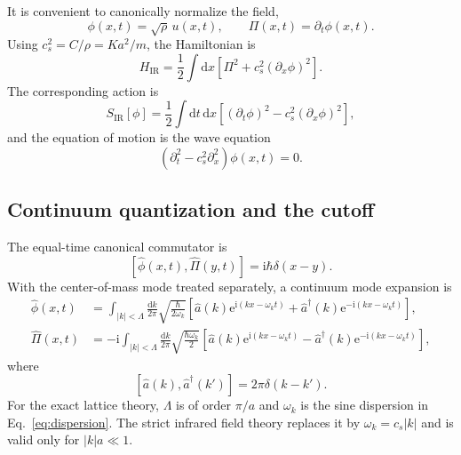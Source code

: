 \documentclass[11pt]{article}
\newcommand{\dd}{\mathrm{d}}
\newcommand{\e}{\mathrm{e}}
\newcommand{\ii}{\mathrm{i}}
\newcommand{\comm}[2]{\left[#1,#2\right]}
\begin{document}
It is convenient to canonically normalize the field,
\begin{equation}
  \phi(x,t)=\sqrt\rho\,u(x,t),
  \qquad
  \Pi(x,t)=\partial_t\phi(x,t).
  \label{eq:phirescale}
\end{equation}
Using $c_s^2=C/\rho=Ka^2/m$, the Hamiltonian is
\begin{equation}
  \boxed{
  H_{\mathrm{IR}}
  =\frac12\int\dd x\left[
    \Pi^2+c_s^2(\partial_x\phi)^2
  \right].
  }
  \label{eq:Hscalar}
\end{equation}
The corresponding action is
\begin{equation}
  S_{\mathrm{IR}}[\phi]
  =\frac12\int\dd t\,\dd x\left[
    (\partial_t\phi)^2-c_s^2(\partial_x\phi)^2
  \right],
  \label{eq:Sscalar}
\end{equation}
and the equation of motion is the wave equation
\begin{equation}
  \boxed{
  (\partial_t^2-c_s^2\partial_x^2)\phi(x,t)=0.
  }
  \label{eq:waveequation}
\end{equation}

\subsection{Continuum quantization and the cutoff}

The equal-time canonical commutator is
\begin{equation}
  \comm{\hat\phi(x,t)}{\hat\Pi(y,t)}
  =\ii\hbar\delta(x-y).
  \label{eq:continuumCCR}
\end{equation}
With the center-of-mass mode treated separately, a continuum mode expansion
is
\begin{align}
  \hat\phi(x,t)
  &=\int_{|k|<\Lambda}\frac{\dd k}{2\pi}
  \sqrt{\frac{\hbar}{2\omega_k}}
  \left[
    \hat a(k)\e^{\ii(kx-\omega_kt)}
    +\hat a^\dagger(k)\e^{-\ii(kx-\omega_kt)}
  \right],
  \label{eq:continuumphi}
  \\
  \hat\Pi(x,t)
  &=-\ii\int_{|k|<\Lambda}\frac{\dd k}{2\pi}
  \sqrt{\frac{\hbar\omega_k}{2}}
  \left[
    \hat a(k)\e^{\ii(kx-\omega_kt)}
    -\hat a^\dagger(k)\e^{-\ii(kx-\omega_kt)}
  \right],
  \label{eq:continuumPi}
\end{align}
where
\begin{equation}
  \comm{\hat a(k)}{\hat a^\dagger(k')}
  =2\pi\delta(k-k').
  \label{eq:continuumaCCR}
\end{equation}
For the exact lattice theory, $\Lambda$ is of order $\pi/a$ and
$\omega_k$ is the sine dispersion in Eq.~\eqref{eq:dispersion}.  The
strict infrared field theory replaces it by $\omega_k=c_s|k|$ and is valid
only for $|k|a\ll1$.
\end{document}
